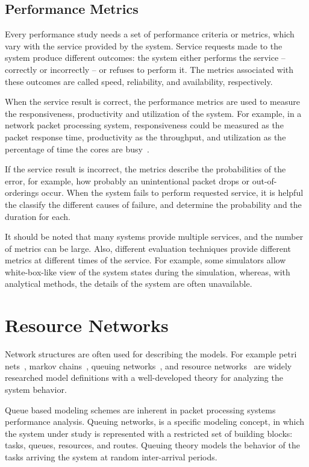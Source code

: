 \subsection{Performance Metrics}
Every performance study needs a set of performance criteria or metrics, which vary with the service provided by the system. Service requests made to the system produce different outcomes: the system either performs the service -- correctly or incorrectly -- or refuses to perform it. The metrics associated with these outcomes are called speed, reliability, and availability, respectively.~\cite{jain:1991:AOCSPA}

When the service result is correct, the performance metrics are used to measure the responsiveness, productivity and utilization of the system. For example, in a network packet processing system, responsiveness could be measured as the packet response time, productivity as the throughput, and utilization as the percentage of time the cores are busy~\cite{cavium:2010:fundamentals}.~\cite{jain:1991:AOCSPA}

If the service result is incorrect, the metrics describe the probabilities of the error, for example, how probably an unintentional packet drops or out-of-orderings occur. When the system fails to perform requested service, it is helpful the classify the different causes of failure, and determine the probability and the duration for each.~\cite{jain:1991:AOCSPA}

It should be noted that many systems provide multiple services, and the number of metrics can be large. Also, different evaluation techniques provide different metrics at different times of the service. For example, some simulators allow white-box-like view of the system states during the simulation, whereas, with analytical methods, the details of the system are often unavailable.~\cite{jain:1991:AOCSPA}

\section{Resource Networks}
Network structures are often used for describing the models. For example petri nets~\cite{Peterson:1981:Petri}, markov chains~\cite{Bolch:2006:Queuing}, queuing networks~\cite{Bolch:2006:Queuing}, and resource networks~\cite{Menasce:1994:CPP} are widely researched model definitions with a well-developed theory for analyzing the system behavior.

Queue based modeling schemes are inherent in packet processing systems performance analysis. Queuing networks, is a specific modeling concept, in which the system under study is represented with a restricted set of building blocks: tasks, queues, resources, and routes. Queuing theory models the behavior of the tasks arriving the system at random inter-arrival periods.~\cite{Bolch:2006:Queuing}

